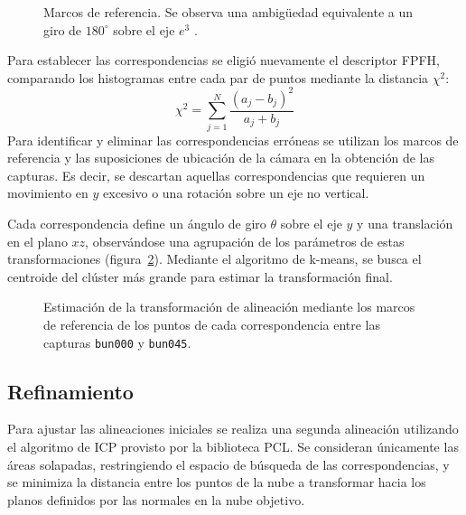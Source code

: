 		\begin{figure}
			\caption{\label{fig:marco_referencia_iss}Marcos de referencia. Se observa una ambigüedad equivalente a un giro de $180^{\circ}$ sobre el eje $e^{3}$ .}
		\end{figure}

		Para establecer las correspondencias se eligió nuevamente el descriptor FPFH,
		comparando los histogramas entre cada par de puntos mediante la distancia $\chi^2$:
		\[ \chi^2 = \sum_{j=1}^{N} \frac{\left(a_j - b_j\right)^2}{a_j + b_j} \]
		Para identificar y eliminar las correspondencias erróneas se utilizan
		los marcos de referencia y las suposiciones de ubicación de la cámara
		en la obtención de las capturas.  Es decir, se descartan aquellas correspondencias que
		requieren un movimiento en $y$ excesivo o una rotación sobre un eje no
		vertical. 

		Cada correspondencia define un ángulo de giro $\theta$ sobre
		el eje $y$ y una translación en el plano $xz$, observándose una agrupación
		de los parámetros de estas transformaciones (figura~\ref{fig:cluster}).
		Mediante el algoritmo de k-means, se busca el centroide del clúster más grande
		para estimar la transformación final.

		\begin{figure}
			\centering
			\begin{subfigure}{\linewidth}
				\centering
				\begin{tikzpicture}
					
				\end{tikzpicture}
			\end{subfigure}
			\begin{subfigure}{\linewidth}
				
			\end{subfigure}
				\caption{\label{fig:cluster}Estimación de la transformación de alineación
				mediante los marcos de referencia de los puntos de cada correspondencia
				entre las capturas \texttt{bun000} y \texttt{bun045}.}
		\end{figure}



	\subsection{Refinamiento}
	Para ajustar las alineaciones iniciales se realiza una segunda alineación utilizando
	el algoritmo de ICP provisto por la biblioteca PCL.
	Se consideran únicamente las áreas solapadas, restringiendo el espacio de
	búsqueda de las correspondencias, y se minimiza la distancia entre los puntos
	de la nube a transformar hacia los planos definidos por las normales en la nube objetivo.

